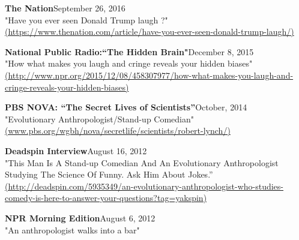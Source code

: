 \documentclass[letterpaper,11pt]{article}
\begin{document}
{{{{\begin{flushleft}
 \textbf{The Nation}\hfill   September 26, 2016\\
 {"Have you ever seen Donald Trump laugh ?"} \\
 \href{https://www.thenation.com/article/have-you-ever-seen-donald-trump-laugh/}{(https://www.thenation.com/article/have-you-ever-seen-donald-trump-laugh/)}


\end{flushleft}

\begin{flushleft}
\textbf {National Public Radio:“The Hidden Brain"}\hfill December 8, 2015 \\
{"How what makes you laugh and cringe reveals your hidden biases"}\\
 \href{http://www.npr.org/2015/12/08/458307977/how-what-makes-you-laugh-and-cringe-reveals-your-hidden-biases}{(http://www.npr.org/2015/12/08/458307977/how-what-makes-you-laugh-and-cringe-reveals-your-hidden-biases)} \\

\end{flushleft}

\begin{flushleft}
\textbf {PBS NOVA: “The Secret Lives of Scientists”}\hfill October, 2014 \\
{"Evolutionary Anthropologist/Stand-up Comedian"} \\
 \href{http://www.pbs.org/wgbh/nova/secretlife/scientists/robert-lynch/}{(www.pbs.org/wgbh/nova/secretlife/scientists/robert-lynch/)}
\end{flushleft}




\begin{flushleft}
 \textbf{Deadspin Interview}\hfill August 16, 2012\\
 {"This Man Is A Stand-up Comedian And An Evolutionary Anthropologist Studying The Science Of Funny. Ask Him About Jokes.”}\\
 \href{http://deadspin.com/5935349/an-evolutionary-anthropologist-who-studies-comedy-is-here-to-answer-your-questions?tag=yakspin}{(http://deadspin.com/5935349/an-evolutionary-anthropologist-who-studies-comedy-is-here-to-answer-your-questions?tag=yakspin)}
\end{flushleft}


\begin{flushleft}
 \textbf {NPR Morning Edition}\hfill August 6, 2012\\
 {"An anthropologist walks into a bar"}


\end{flushleft}}}}}
\end{document}
